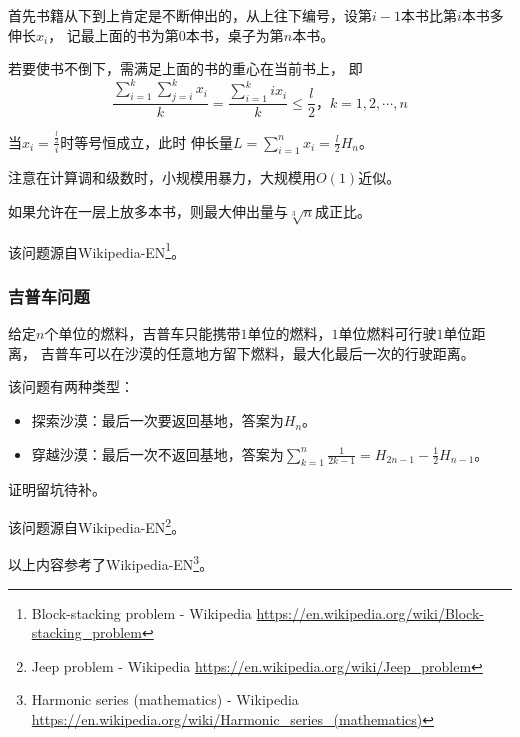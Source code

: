 首先书籍从下到上肯定是不断伸出的，从上往下编号，设第$i-1$本书比第$i$本书多伸长$x_i$，
记最上面的书为第$0$本书，桌子为第$n$本书。

若要使书不倒下，需满足上面的书的重心在当前书上，
即
\begin{displaymath}
	\frac{\displaystyle \sum_{i=1}^k{\sum_{j=i}^k{x_i}}}{k}=
	\frac{\displaystyle \sum_{i=1}^k{ix_i}}{k}\leq \frac{l}{2}，k=1,2,\cdots,n
\end{displaymath}

当$x_i=\frac{\frac{l}{2}}{i}$时等号恒成立，此时
伸长量$\displaystyle L=\sum_{i=1}^n{x_i}=\frac{l}{2}H_n$。

注意在计算调和级数时，小规模用暴力，大规模用$O(1)$近似。

如果允许在一层上放多本书，则最大伸出量与$\sqrt[3]{n}$成正比。

该问题源自Wikipedia-EN\footnote{Block-stacking problem - Wikipedia
	\url{https://en.wikipedia.org/wiki/Block-stacking\_problem}}。
\subsubsection{吉普车问题}

给定$n$个单位的燃料，吉普车只能携带$1$单位的燃料，$1$单位燃料可行驶$1$单位距离，
吉普车可以在沙漠的任意地方留下燃料，最大化最后一次的行驶距离。

该问题有两种类型：
\begin{itemize}
    \item 探索沙漠：最后一次要返回基地，答案为$H_n$。
    \item 穿越沙漠：最后一次不返回基地，答案为$\displaystyle
    \sum_{k=1}^n{\frac{1}{2k-1}}=H_{2n-1}-\frac{1}{2}H_{n-1}$。
\end{itemize}

证明留坑待补。

该问题源自Wikipedia-EN\footnote{Jeep problem - Wikipedia
	\url{https://en.wikipedia.org/wiki/Jeep\_problem}}。

以上内容参考了Wikipedia-EN\footnote{Harmonic series (mathematics) - Wikipedia
	\url{https://en.wikipedia.org/wiki/Harmonic\_series\_(mathematics)}}。
